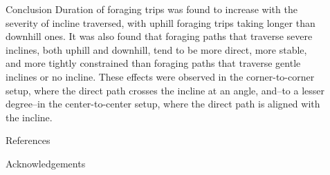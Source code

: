 \documentclass[final,table]{beamer}
\newlength{\sepwid}
\newlength{\onecolwid}
\newlength{\twocolwid}
\begin{document}
\begin{frame}[t]
\begin{columns}[t]
\begin{column}{\twocolwid}
\end{column} %

\begin{column}{\sepwid}\end{column} %

\begin{column}{\onecolwid} %
\vspace{-3.5ex}
\begin{block}{Conclusion}
\vspace{-2.5ex}
\small{
Duration of foraging trips was found to increase with the severity of incline traversed, with uphill foraging trips taking longer than downhill ones. It was also found that foraging paths that traverse severe inclines, both uphill and downhill, tend to be more direct, more stable, and more tightly constrained than foraging paths that traverse gentle inclines or no incline. These effects were observed in the corner-to-corner setup, where the direct path crosses the incline at an angle, and--to a lesser degree--in the center-to-center setup, where the direct path is aligned with the incline.
}
\end{block}


\vspace{-3ex}
\begin{block}{References}
\vspace{-2.5ex}
\nocite{*} %
{\tiny
}
\end{block}

\vspace{-3.5ex}

\begin{block}{Acknowledgements}
\vspace{-2.5ex}
\begin{spacing}{1.0}
\scriptsize{}
\end{spacing}
\end{block}



\end{column}
\end{columns}
\end{frame}
\end{document}
